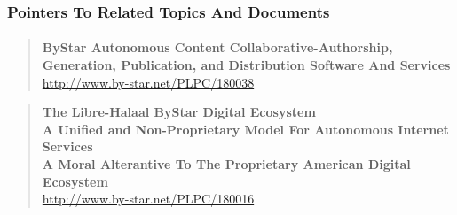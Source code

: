 \begin{comment}
*****  [[elisp:(org-cycle)][| ]]  [[elisp:(blee:ppmm:org-mode-toggle)][Nat]] [[elisp:(beginning-of-buffer)][Top]] [[elisp:(delete-other-windows)][(1)]] || /Frame/ *Label=PointersToRelatedTopicsAndDocuments*  Pointers To Related Topics And Documents ::  [[elisp:(org-cycle)][| ]]
\end{comment}

\begin{frame}[fragile,label=PointersToRelatedTopicsAndDocuments]
    \frametitle{Pointers To Related Topics And Documents}
    \framesubtitle{}


\begin{comment}
***** DBLOCK -- mention-lcnt PLPC-180038
\end{comment}

\begin{quote}
  \textbf{ByStar Autonomous Content Collaborative-Authorship, Generation, Publication, and Distribution Software And Services}\\
  \href{http://www.by-star.net/PLPC/180038}{http://www.by-star.net/PLPC/180038}
\end{quote}


\begin{comment}
***** DBLOCK -- mention-lcnt PLPC-180016
\end{comment}

\begin{quote}
  \textbf{The Libre-Halaal ByStar Digital Ecosystem}\\
  \textbf{A Unified and Non-Proprietary Model For Autonomous Internet Services}\\
  \textbf{A Moral Alterantive To The Proprietary American Digital Ecosystem}\\
  \href{http://www.by-star.net/PLPC/180016}{http://www.by-star.net/PLPC/180016}
\end{quote}


\end{frame}



